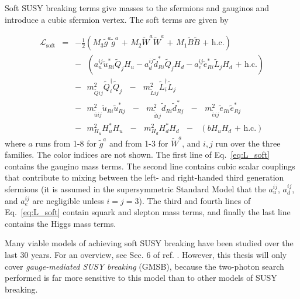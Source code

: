 \documentclass[dissertation.tex]{subfiles}
\begin{document}
Soft SUSY breaking terms give masses to the sfermions and gauginos and introduce a cubic sfermion vertex.  The soft terms are given by

\begin{eqnarray}
\label{eq:L_soft}
\mathcal{L}_{\mathrm{soft}} &=& -\frac{1}{2}(M_{3}\widetilde{g}^{a}\widetilde{g}^{a}\mbox{ + }M_{2}\widetilde{W}^{a}\widetilde{W}^{a}\mbox{ + }M_{1}\widetilde{B}\widetilde{B}\mbox{ + h.c.})\nonumber \\
&&-\mbox{ }(a_{u}^{ij}\widetilde{u}_{Ri}^{*}\widetilde{Q}_{j}H_{u} - a_{d}^{ij}\widetilde{d}_{Ri}^{*}\widetilde{Q}_{j}H_{d} - a_{e}^{ij}\widetilde{e}_{Ri}^{*}\widetilde{L}_{j}H_{d}\mbox{ + h.c.})\nonumber \\
&&-\mbox{ }m_{\widetilde{Q}ij}^{2}\widetilde{Q}_{i}^{\dag}\widetilde{Q}_{j}\mbox{ }-\mbox{ }m_{\widetilde{L}ij}^{2}\widetilde{L}_{i}^{\dag}\widetilde{L}_{j}\mbox{ }\nonumber \\
&&-\mbox{ }m_{\widetilde{\overline{u}}ij}^{2}\widetilde{u}_{Ri}\widetilde{u}_{Rj}^{*}\mbox{ }-\mbox{ }m_{\widetilde{\overline{d}}ij}^{2}\widetilde{d}_{Ri}\widetilde{d}_{Rj}^{*}\mbox{ }-\mbox{ }m_{\widetilde{\overline{e}}ij}^{2}\widetilde{e}_{Ri}\widetilde{e}_{Rj}^{*}\mbox{ }\nonumber \\
&&-\mbox{ }m_{H_{u}}^{2}H_{u}^{*}H_{u}\mbox{ }-\mbox{ }m_{H_{d}}^{2}H_{d}^{*}H_{d}\mbox{ }-\mbox{ }(bH_{u}H_{d}\mbox{ + h.c.})
\end{eqnarray}
where $a$ runs from 1-8 for $\widetilde{g}^{a}$ and from 1-3 for $\widetilde{W}^{a}$, and $i,j$ run over the three families.  The color indices are not shown.  The first line of Eq.~\ref{eq:L_soft} contains the gaugino mass terms.  The second line contains cubic scalar couplings that contribute to mixing between the left- and right-handed third generation sfermions (it is assumed in the supersymmetric Standard Model that the $a_{u}^{ij}$, $a_{d}^{ij}$, and $a_{e}^{ij}$ are negligible unless $i = j = 3$).  The third and fourth lines of Eq.~\ref{eq:L_soft} contain squark and slepton mass terms, and finally the last line contains the Higgs mass terms.

Many viable models of achieving soft SUSY breaking have been studied over the last 30 years.  For an overview, see Sec. 6 of ref. \cite{SUSY_primer}.  However, this thesis will only cover \textit{gauge-mediated SUSY breaking} (GMSB), because the two-photon search performed is far more sensitive to this model than to other models of SUSY breaking.
\end{document}
